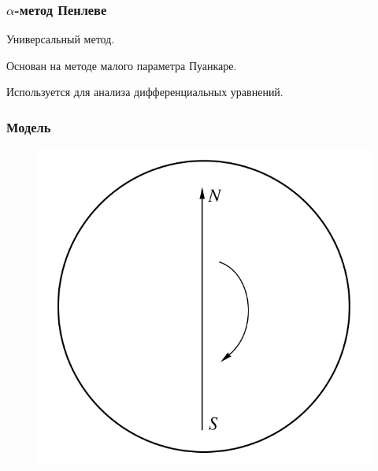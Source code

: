 \documentclass[hyperref={pdftex,unicode}]{beamer}
\begin{document}
\begin{frame}

\frametitle{$\alpha $-метод Пенлеве}

Универсальный метод.

Основан на методе малого параметра Пуанкаре. 

Используется для анализа дифференциальных уравнений. 

\end{frame}


\begin{frame}
\frametitle{Модель}

\begin{figure}[H] 
  \begin{center}

  \begin{minipage}[h]{0.4\linewidth}

  \includegraphics[width=1\linewidth]{magnitnoe_pole}

  
  \end{minipage}
  \hfill   
  \begin{minipage}[h]{0.4\linewidth}
    

\end{minipage}
\end{center}
\end{figure}
\end{frame}
\end{document}
